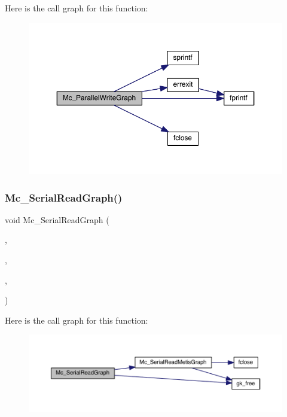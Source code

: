 Here is the call graph for this function\+:\nopagebreak
\begin{figure}[H]
\begin{center}
\leavevmode
\includegraphics[width=350pt]{a00954_a7ced85ce3eee74389db1e96de523bb13_cgraph}
\end{center}
\end{figure}
\mbox{\label{a00954_a8c060a2a87973834a7cda156ae5e833e}} 
\subsubsection{\texorpdfstring{Mc\+\_\+\+Serial\+Read\+Graph()}{Mc\_SerialReadGraph()}}
{\footnotesize\ttfamily void Mc\+\_\+\+Serial\+Read\+Graph (\begin{DoxyParamCaption}\item[{\hyperlink{a00734}{graph\+\_\+t} $\ast$}]{,  }\item[{char $\ast$}]{,  }\item[{\hyperlink{a00876_aaa5262be3e700770163401acb0150f52}{idx\+\_\+t} $\ast$}]{,  }\item[{M\+P\+I\+\_\+\+Comm}]{ }\end{DoxyParamCaption})}

Here is the call graph for this function\+:\nopagebreak
\begin{figure}[H]
\begin{center}
\leavevmode
\includegraphics[width=350pt]{a00954_a8c060a2a87973834a7cda156ae5e833e_cgraph}
\end{center}
\end{figure}
\mbox{\label{a00954_a6228d68f75df6d736a0748c1cab40862}} 
